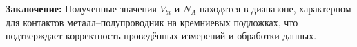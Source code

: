 \documentclass[a4paper,12pt]{article}
\begin{document}
\noindent \textbf{Заключение:} Полученные значения $V_{bi}$ и $N_A$ находятся в диапазоне, характерном для контактов металл--полупроводник на кремниевых подложках, что подтверждает корректность проведённых измерений и обработки данных.









\end{document}
